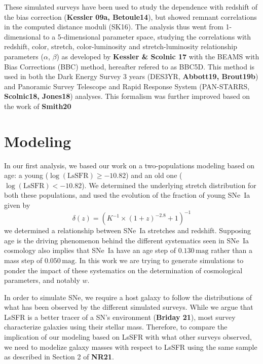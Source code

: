 \documentclass[]{aa}
\begin{document}
These simulated surveys have been used to study the dependence with redshift of
the bias correction (\textbf{Kessler 09a, Betoule14}), but showed remnant
correlations in the computed distance moduli (SK16). The analysis thus went from
1-dimensional to a 5-dimensional parameter space, studying the correlations with
redshift, color, stretch, color-luminosity and stretch-luminosity relationship
parameters ($\alpha$, $\beta$) as developed by \textbf{Kessler \& Scolnic 17}
with the BEAMS with Bias Corrections (BBC) method, hereafter refered to as
BBC5D. This method is used in both the Dark Energy Survey 3 years (DES3YR,
\textbf{Abbott19, Brout19b}) and Panoramic Survey Telescope and Rapid Response
System (PAN-STARRS, \textbf{Scolnic18, Jones18}) analyses. This formalism was
further improved based on the work of \textbf{Smith20}

\section{Modeling}\label{sec:model}

In our first analysis, we based our work on a two-populations modeling based on
age: a young ($\log(\mathrm{LsSFR}) \geq -10.82$) and an old one
($\log(\mathrm{LsSFR}) < -10.82$). We determined the underlying stretch
distribution for both these populations, and used the evolution of the fraction
of young SNe~Ia given by
\begin{equation}\label{eq:delta}
    \delta(z) = \left(K^{-1}\times\left(1+z\right)^{-2.8}+1\right)^{-1} 
\end{equation}
we determined a relationship between SNe~Ia stretches and redshift. Supposing
age is the driving phenomenon behind the different systematics seen in SNe~Ia
cosmology also implies that SNe~Ia have an age step of $0.130\,\mathrm{mag}$
rather than a mass step of $0.050\,\mathrm{mag}$. In this work we are trying to
generate simulations to ponder the impact of these systematics on the
determination of cosmological parameters, and notably $w$.

In order to simulate SNe, we require a host galaxy to follow the distributions
of what has been observed by the different simulated surveys. While we argue
that LsSFR is a better tracer of a SN's environment (\textbf{Briday 21}), most
survey characterize galaxies using their stellar mass. Therefore, to compare the
implication of our modeling based on LsSFR with what other surveys observed, we
need to modelize galaxy masses with respect to LsSFR using the same sample as
described in Section 2 of \textbf{NR21}.
\end{document}

